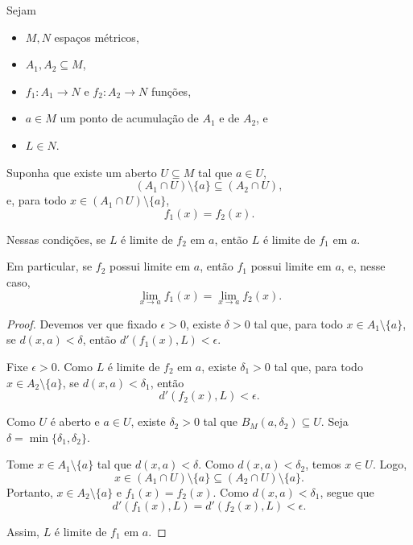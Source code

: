 \begin{proposition}\label{prop:localidadeLimite}
    Sejam
    \begin{itemize}
        \item $M, N$ espaços métricos,
        \item $A_1,A_2\subseteq M$,
        \item $f_1:A_1\to N$ e $f_2:A_2\to N$ funções,
        \item $a\in M$ um ponto de acumulação de $A_1$ e de $A_2$, e
        \item $L\in N$.
    \end{itemize}

    Suponha que existe um aberto $U\subseteq M$ tal que $a\in U$,
    \[
        (A_1\cap U)\setminus\{a\}\subseteq (A_2\cap U),
    \]
    e, para todo $x\in (A_1\cap U)\setminus\{a\}$,
    \[
        f_1(x)=f_2(x).
    \]

    Nessas condições, se $L$ é limite de $f_2$ em $a$, então $L$ é limite de $f_1$ em $a$.

    Em particular, se $f_2$ possui limite em $a$, então $f_1$ possui limite em $a$, e, nesse caso,
    \[
        \lim_{x\to a} f_1(x)=\lim_{x\to a} f_2(x).
    \]
\end{proposition}

\begin{proof}
    Devemos ver que fixado $\epsilon>0$, existe $\delta>0$ tal que, para todo $x \in A_1\setminus\{a\}$, se $d(x, a) < \delta$, então $d'(f_1(x), L) < \epsilon$.

    Fixe $\epsilon>0$.
    Como $L$ é limite de $f_2$ em $a$, existe $\delta_1>0$ tal que, para todo $x\in A_2\setminus\{a\}$, se $d(x,a)<\delta_1$, então
    \[
        d'(f_2(x),L)<\epsilon.
    \]

    Como $U$ é aberto e $a\in U$, existe $\delta_2>0$ tal que $B_M(a,\delta_2)\subseteq U$.
    Seja $\delta=\min\{\delta_1,\delta_2\}$.

    Tome $x\in A_1\setminus\{a\}$ tal que $d(x,a)<\delta$.
    Como $d(x,a)<\delta_2$, temos $x\in U$.
    Logo,
    \[
        x\in (A_1\cap U)\setminus\{a\}\subseteq (A_2\cap U)\setminus\{a\}.
    \]
    Portanto, $x\in A_2\setminus\{a\}$ e $f_1(x)=f_2(x)$.
    Como $d(x,a)<\delta_1$, segue que
    \[
        d'(f_1(x),L)=d'(f_2(x),L)<\epsilon.
    \]

    Assim, $L$ é limite de $f_1$ em $a$.
\end{proof}

